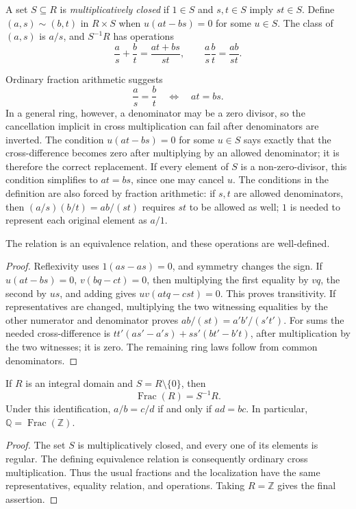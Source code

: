 \begin{definition}
A set \(S\subseteq R\) is \emph{multiplicatively closed} if \(1\in S\) and
\(s,t\in S\) imply \(st\in S\). Define \((a,s)\sim(b,t)\) in \(R\times S\)
when \(u(at-bs)=0\) for some \(u\in S\). The class of \((a,s)\) is \(a/s\),
and \(S^{-1}R\) has operations
\[\frac as+\frac bt=\frac{at+bs}{st},\qquad
\frac as\frac bt=\frac{ab}{st}.\]
\end{definition}
Ordinary fraction arithmetic suggests
\[
\frac as=\frac bt\quad\Longleftrightarrow\quad at=bs.
\]
In a general ring, however, a denominator may be a zero divisor, so the
cancellation implicit in cross multiplication can fail after denominators
are inverted.  The condition \(u(at-bs)=0\) for some \(u\in S\) says exactly
that the cross-difference becomes zero after multiplying by an allowed
denominator; it is therefore the correct replacement.  If every element of
\(S\) is a non-zero-divisor, this condition simplifies to \(at=bs\), since
one may cancel \(u\).  The conditions in the definition are also forced by
fraction arithmetic: if \(s,t\) are allowed denominators, then
\((a/s)(b/t)=ab/(st)\) requires \(st\) to be allowed as well; \(1\) is needed
to represent each original element as \(a/1\).
\begin{proposition}
The relation is an equivalence relation, and these operations are
well-defined.
\end{proposition}
\begin{proof}
Reflexivity uses \(1(as-as)=0\), and symmetry changes the sign. If
\(u(at-bs)=0\), \(v(bq-ct)=0\), then multiplying the first equality by
\(vq\), the second by \(us\), and adding gives \(uv(atq-cst)=0\).
This proves transitivity. If representatives are changed, multiplying the
two witnessing equalities by the other numerator and denominator proves
\(ab/(st)=a'b'/(s't')\). For sums the needed cross-difference is
\(tt'(as'-a's)+ss'(bt'-b't)\), after multiplication by the two witnesses;
it is zero. The remaining ring laws follow from common denominators.
\end{proof}
\begin{proposition}
If \(R\) is an integral domain and \(S=R\setminus\{0\}\), then
\[\operatorname{Frac}(R)=S^{-1}R.\]
Under this identification, \(a/b=c/d\) if and only if \(ad=bc\).
In particular, \(\mathbb Q=\operatorname{Frac}(\mathbb Z)\).
\end{proposition}
\begin{proof}
The set \(S\) is multiplicatively closed, and every one of its elements is
regular.  The defining equivalence relation is consequently ordinary cross
multiplication.  Thus the usual fractions and the localization have the same
representatives, equality relation, and operations.  Taking \(R=\mathbb Z\)
gives the final assertion.
\end{proof}
